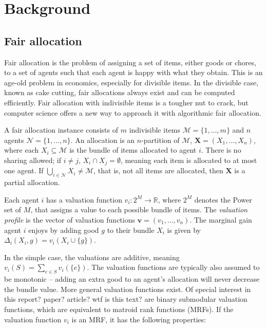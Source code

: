 \section{Background}\label{background}

\subsection{Fair allocation}
Fair allocation is the problem of assigning a set of items, either goods or chores, to a set of agents such that each agent is happy with what they obtain. This is an age-old problem in economics, especially for divisible items. In the divisible case, known as cake cutting, fair allocations always exist and can be computed efficiently. Fair allocation with indivisible items is a tougher nut to crack, but computer science offers a new way to approach it with algorithmic fair allocation.

A fair allocation instance consists of $m$ indivisible items $\mathcal{M} = \{1, \ldots ,m\}$ and $n$ agents $\mathcal{N} = \{1, \ldots ,n\}$. An allocation is an $n$-partition of $\mathcal{M}$, $\textbf{X} = (X_1, \ldots, X_n)$, where each $X_i \subseteq \mathcal{M}$ is the bundle of items allocated to agent $i$. There is no sharing allowed; if $i \not = j$, $X_i \cap X_j = \emptyset$, meaning each item is allocated to at most one agent. If $\bigcup_{i \in \mathcal{N} } X_i  \not =  \mathcal{M}$, that is, not all items are allocated, then $\textbf{X}$ is a partial allocation.

Each agent $i$ has a valuation function $v_i: 2^M \rightarrow \mathbb{R}$, where $2^M$ denotes the Power set of $M$, that assigns a value to each possible bundle of items. The \textit{valuation profile} is the vector of valuation functions $\mathbf{v} = (v_1, \ldots, v_n)$. The marginal gain agent $i$ enjoys by adding good $g$ to their bundle $X_i$ is given by $\Delta_i(X_i, g) = v_i(X_i \cup \{g\})$.

In the simple case, the valuations are additive, meaning $v_i(S) = \sum_{e \in S} v_i(\{e\})$. The valuation functions are typically also assumed to be monotonic – adding an extra good to an agent's allocation will never decrease the bundle value. More general valuation functions exist. Of special interest in this report? paper? article? wtf is this text? are binary submodular valuation functions, which are equivalent to matroid rank functions (MRFs). If the valuation function $v_i$ is an MRF, it has the following properties:

